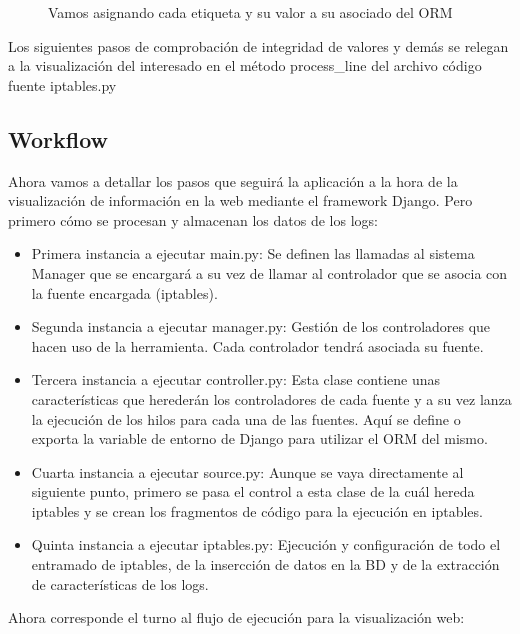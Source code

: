 \begin{figure}[H]

\caption{Vamos asignando cada etiqueta y su valor a su asociado del ORM}
\end{figure}

Los siguientes pasos de comprobación de integridad de valores y demás se relegan a la visualización del interesado en el método process\_line del archivo código fuente iptables.py\\

\pagebreak
\subsection{Workflow}
Ahora vamos a detallar los pasos que seguirá la aplicación a la hora de la visualización de información en la web mediante el framework Django. Pero primero cómo se procesan y almacenan los datos de los logs:\\

\begin{itemize}
\item Primera instancia a ejecutar main.py: Se definen las llamadas al sistema Manager que se encargará a su vez de llamar al controlador que se asocia con la fuente encargada (iptables).
\item Segunda instancia a ejecutar manager.py: Gestión de los controladores que hacen uso de la herramienta. Cada controlador tendrá asociada su fuente.
\item Tercera instancia a ejecutar controller.py: Esta clase contiene unas características que herederán los controladores de cada fuente y a su vez lanza la ejecución de los hilos para cada una de las fuentes. Aquí se define o exporta la variable de entorno de Django para utilizar el ORM del mismo.
\item Cuarta instancia a ejecutar source.py: Aunque se vaya directamente al siguiente punto, primero se pasa el control a esta clase de la cuál hereda iptables y se crean los fragmentos de código para la ejecución en iptables.
\item Quinta instancia a ejecutar iptables.py: Ejecución y configuración de todo el entramado de iptables, de la insercción de datos en la BD y de la extracción de características de los logs.
\end{itemize}

Ahora corresponde el turno al flujo de ejecución para la visualización web:\\

